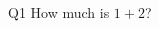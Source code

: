  {\begin{question}{Q1}
 How much is $1+2$?
 \begin{multicols}{2}\AMCBoxedAnswers\begin{choices}
 \end{choices}\end{multicols}\end{question}
}
 

